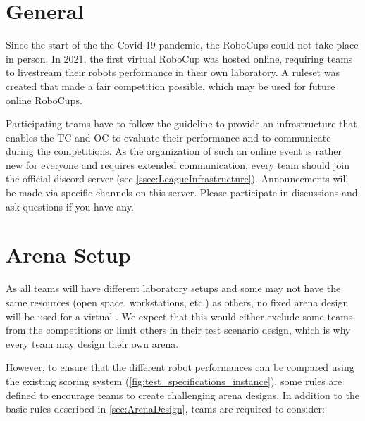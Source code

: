 
\section{General} 
\label{sec:VRCGeneral}

Since the start of the the Covid-19 pandemic, the RoboCups could not take place in person.
In 2021, the first virtual RoboCup was hosted online, requiring teams to livestream their robots performance in their own laboratory.
A ruleset was created that made a fair competition possible, which may be used for future online RoboCups.

Participating teams have to follow the guideline to provide an infrastructure that enables the TC and OC to evaluate their performance and to communicate during the competitions.
As the organization of such an online event is rather new for everyone and requires extended communication, 
every team should join the official \RCAW discord server (see \ref{ssec:LeagueInfrastructure}).
Announcements will be made via specific channels on this server.
Please participate in discussions and ask questions if you have any.

\section{Arena Setup} 
\label{sec:VRCArenaSetup}

As all teams will have different laboratory setups and some may not have the same resources (open space, workstations, etc.) as others, no fixed arena design will be used for a virtual \RCAW. We expect that this would either exclude some teams from the competitions or limit others in their test scenario design, which is why every team may design their own arena.

However, to ensure that the different robot performances can be compared using the existing scoring system (\ref{fig:test_specifications_instance}), some rules are defined to encourage teams to create challenging arena designs. In addition to the basic rules described in \ref{sec:ArenaDesign}, teams are required to consider: 
  
